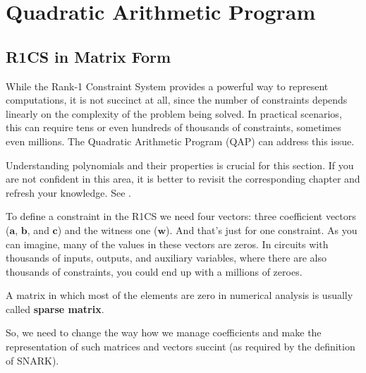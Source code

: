 \documentclass[../lecture-notes.tex]{subfiles}
\begin{document}
\section{Quadratic Arithmetic Program}
\subsection{R1CS in Matrix Form}

While the Rank-1 Constraint System provides a powerful way to represent computations, it is not 
succinct at all, since the number of constraints depends linearly on the complexity of the problem 
being solved. In practical scenarios, this can require tens or even hundreds of thousands of 
constraints, sometimes even millions. The Quadratic Arithmetic Program (QAP) can address this issue.

\begin{remark}
    Understanding polynomials and their properties is crucial for this section. If you are not 
    confident in this area, it is better to revisit the corresponding chapter and refresh your
    knowledge. See .
\end{remark}

To define a constraint in the R1CS we need four vectors: three coefficient vectors ($\mathbf{a}$, $\mathbf{b}$, and
$\mathbf{c}$) and the witness one ($\mathbf{w}$). And that's just for one constraint. As you can imagine, many of
the values in these vectors are zeros. In circuits with thousands of inputs, outputs, and auxiliary
variables, where there are also thousands of constraints, you could end up with a millions of zeroes.
\begin{remark}
    A matrix in which most of the elements are zero in numerical analysis is usually called \textbf{sparse
    matrix}.
\end{remark}

So, we need to change the way how we manage coefficients and make the representation of such matrices and vectors succint (as required by the definition of SNARK).
\end{document}
